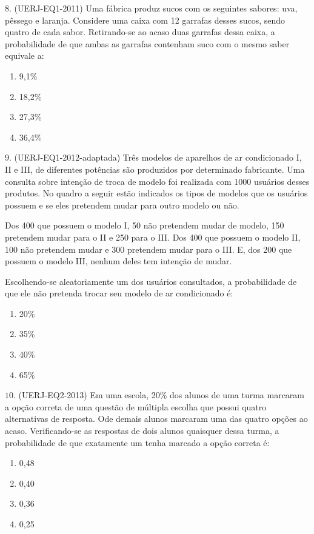 \(8.\) (UERJ-EQ1-2011) Uma fábrica produz sucos com os seguintes sabores: uva, pêssego e laranja. Considere uma caixa com 12 garrafas desses sucos, sendo quatro de cada sabor. Retirando-se ao acaso duas garrafas dessa caixa, a probabilidade de que ambas as garrafas contenham suco com o mesmo saber equivale a:
\begin{enumerate}
\item {} 
9,1\%

\item {} 
18,2\%

\item {} 
27,3\%

\item {} 
36,4\%

\end{enumerate}

\(9.\) (UERJ-EQ1-2012-adaptada) Três modelos de aparelhos de ar condicionado I, II e III, de diferentes potências são produzidos por determinado fabricante. Uma consulta sobre intenção de troca de modelo foi realizada com 1000 usuários desses produtos. No quadro a seguir estão indicados os tipos de modelos que os usuários possuem e se eles pretendem mudar para outro modelo ou não.

Dos 400 que possuem o modelo I, 50 não pretendem mudar de modelo, 150 pretendem mudar para o II e 250 para o III. Dos 400 que possuem o modelo II, 100 não pretendem mudar e 300 pretendem mudar para o III. E, dos 200 que possuem o modelo III, nenhum deles tem intenção de mudar.

Escolhendo-se aleatoriamente um dos usuários consultados, a probabilidade de que ele não pretenda trocar seu modelo de ar condicionado é:
\begin{enumerate}
\item {} 
20\%

\item {} 
35\%

\item {} 
40\%

\item {} 
65\%

\end{enumerate}

\(10.\) (UERJ-EQ2-2013) Em uma escola, 20\% dos alunos de uma turma marcaram a opção correta de uma questão de múltipla escolha que possui quatro alternativas de resposta. Ode demais alunos marcaram uma das quatro opções ao acaso. Verificando-se as respostas de dois alunos quaisquer dessa turma, a probabilidade de que exatamente um tenha marcado a opção correta é:
\begin{enumerate}
\item {} 
0,48

\item {} 
0,40

\item {} 
0,36

\item {} 
0,25

\end{enumerate}

